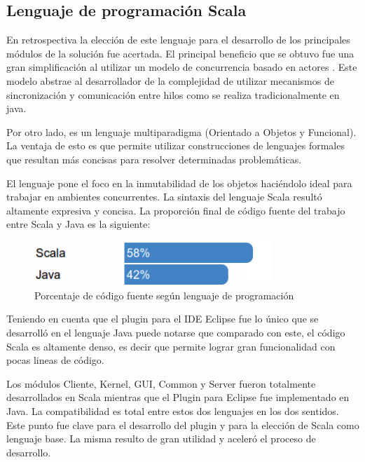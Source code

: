 \documentclass[12pt,a4paper]{article}
\begin{document}
\subsection{Lenguaje de programación Scala}
En retrospectiva la elección de este lenguaje para el desarrollo de los principales módulos de la solución fue
acertada. El principal beneficio que se obtuvo fue una gran simplificación al utilizar un modelo de concurrencia
basado en actores \cite{actors1,actors2}. Este modelo abstrae al desarrollador de la complejidad de utilizar
mecanismos de sincronización y comunicación entre hilos como se realiza tradicionalmente en java.

Por otro lado, es un lenguaje multiparadigma (Orientado a Objetos y Funcional). La ventaja de esto es que permite 
utilizar construcciones de lenguajes formales que resultan más concisas para resolver determinadas problemáticas.

El lenguaje pone el foco en la inmutabilidad de los objetos haciéndolo ideal para trabajar en ambientes concurrentes.
La sintaxis del lenguaje Scala resultó altamente expresiva y concisa. La proporción final de código fuente del trabajo
entre Scala y Java es la siguiente:

	\begin{figure}[!ht]
		\begin{center}
			\includegraphics[width=9cm]{porcentaje.png}
			\caption{\label{porcentaje} Porcentaje de código fuente según lenguaje de programación }
		\end{center}
	\end{figure}

Teniendo en cuenta que el plugin para el IDE Eclipse fue lo único que se desarrolló en el lenguaje Java puede
notarse que comparado con este, el código Scala es altamente denso, es decir que permite lograr gran funcionalidad 
con pocas lineas de código.

Los módulos Cliente, Kernel, GUI, Common y Server fueron totalmente desarrollados en Scala mientras que el Plugin
para Eclipse fue implementado en Java. La compatibilidad es total entre estos dos lenguajes en los dos sentidos.
Este punto fue clave para el desarrollo del plugin y para la elección de Scala como lenguaje base. La misma 
resulto de gran utilidad y aceleró el proceso de desarrollo.
\end{document}

